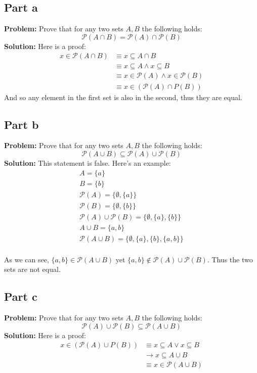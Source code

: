 \documentclass{article}
\begin{document}
\subsection*{Part a}
\textbf{Problem:} Prove that for any two sets $A,B$ the following holds:
$$\mathcal P(A\cap B)=\mathcal P(A)\cap\mathcal P(B)$$
\textbf{Solution:} Here is a proof:
\begin{align*}
  x\in\mathcal P(A\cap B)&\equiv x\subseteq A\cap B\tag{Def. of power set}\\
  &\equiv x\subseteq A \wedge x\subseteq B\tag{Def. of intersection}\\
  &\equiv x\in\mathcal P(A)\wedge x\in\mathcal P(B)\tag{Def. of power set}\\
  &\equiv x\in(\mathcal P(A)\cap P(B))\tag{Def. of intersection}
\end{align*}
And so any element in the first set is also in the second, thus they are equal.

\subsection*{Part b}
\textbf{Problem:} Prove that for any two sets $A,B$ the following holds:
$$\mathcal P(A\cup B)\subseteq\mathcal P(A)\cup\mathcal P(B)$$
\textbf{Solution:} This statement is false. Here's an example:
\begin{gather*}
  A=\{a\}\\
  B=\{b\}\\
  \mathcal P(A)=\{\emptyset,\{a\}\}\\
  \mathcal P(B)=\{\emptyset,\{b\}\}\\
  \mathcal P(A)\cup\mathcal P(B)=\{\emptyset,\{a\},\{b\}\}\\
  A\cup B=\{a,b\}\\
  \mathcal P(A\cup B)=\{\emptyset,\{a\},\{b\},\{a,b\}\}\\
\end{gather*}

As we can see, $\{a,b\}\in\mathcal P(A\cup B)$ yet $\{a,b\}\not\in\mathcal P(A)\cup\mathcal P(B)$. Thus the two sets are not equal.

\subsection*{Part c}
\textbf{Problem:} Prove that for any two sets $A,B$ the following holds:
$$\mathcal P(A)\cup\mathcal P(B)\subseteq\mathcal P(A\cup B)$$
\textbf{Solution:} Here is a proof:
\begin{align*}
  x\in(\mathcal P(A)\cup P(B))&\equiv x\subseteq A\vee x\subseteq B\tag{Def. of power set \& union}\\
  &\rightarrow x\subseteq A\cup B\tag{From union}\\
  &\equiv x\in\mathcal P(A\cup B)\tag{Def. of power set}
\end{align*}
\end{document}
